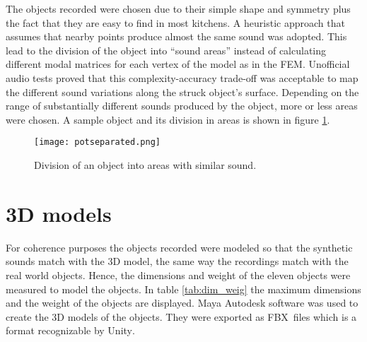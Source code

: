 The objects recorded were chosen due to their simple shape and symmetry plus the fact that they are easy to find in most kitchens. A heuristic approach that assumes that nearby points produce almost the same sound was adopted. This lead to the division of the object into ``sound areas'' instead of calculating different modal matrices for each vertex of the model as in the \gls{FEM}. Unofficial audio tests proved that this complexity-accuracy trade-off was acceptable to map the different sound variations along the struck object's surface. Depending on the range of substantially different sounds produced by the object, more or less areas were chosen. A sample object and its division in areas is shown in figure \ref{fig:pot_sep}. 

\begin{figure}[H]
  \centering
    \texttt{[image: potseparated.png]}
      \caption{Division of an object into areas with similar sound.}
      \label{fig:pot_sep}
\end{figure} 

\section{3D models}

For coherence purposes the objects recorded were modeled so that the synthetic sounds match with the 3D model, the same way the recordings match with the real world objects. Hence, the dimensions and weight of the eleven objects were measured to model the objects. In table \ref{tab:dim_weig} the maximum dimensions and the weight of the objects are displayed. Maya Autodesk software was used to create the 3D models of the objects. They were exported as FBX\textsuperscript\textregistered\ files \cite{bib:fbx} which is a format recognizable by Unity\textsuperscript{\textregistered}.

